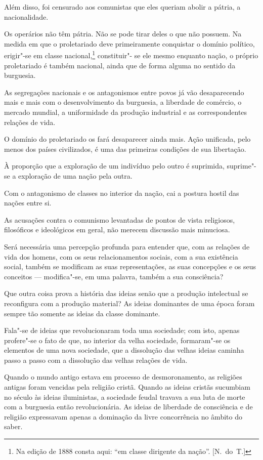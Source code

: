 Além disso, foi censurado aos comunistas que eles queriam abolir a
pátria, a nacionalidade.

Os operários não têm pátria. Não se pode tirar deles o que não
possuem. Na medida em que o proletariado deve primeiramente conquistar
o domínio político, erigir"-se em classe nacional,\footnote{ Na edição de 
1888 consta aqui: “em classe dirigente da nação”. [N.~do~T.]} constituir"-
se ele mesmo enquanto nação, o próprio
proletariado é também nacional, ainda que de forma alguma no sentido da
burguesia.

As segregações nacionais e os antagonismos entre povos já vão desaparecendo
mais e mais com o desenvolvimento da burguesia, a liberdade de
comércio, o mercado mundial, a uniformidade da produção industrial
e as correspondentes relações de vida.

O domínio do proletariado os fará desaparecer ainda mais. Ação
unificada, pelo menos dos países civilizados, é uma das primeiras
condições de sua libertação.

À proporção que a exploração de um indivíduo pelo outro é suprimida,
suprime"-se a exploração de uma nação pela outra.

Com o antagonismo de classes no interior da nação, cai a postura hostil
das nações entre si.

As acusações contra o comunismo levantadas de pontos de vista
religiosos, filosóficos e ideológicos em geral, não merecem discussão
mais minuciosa.

Será necessária uma percepção profunda para entender que, com as
relações de vida dos homens, com os seus relacionamentos sociais, com a
sua existência social, também se modificam as suas representações, as
suas concepções e os seus conceitos  ---  modifica"-se, em uma palavra,
também a sua consciência?

Que outra coisa prova a história das ideias senão que a produção
intelectual se reconfigura com a produção material? As ideias
dominantes de uma época foram sempre tão somente as ideias da classe
dominante.

Fala"-se de ideias que revolucionaram toda uma sociedade; com isto,
apenas profere"-se o fato de que, no interior da velha sociedade,
formaram"-se os elementos de uma nova sociedade, que a dissolução das
velhas ideias caminha passo a passo com a dissolução das velhas
relações de vida.

Quando o mundo antigo estava em processo de desmoronamento, as religiões
antigas foram vencidas pela religião cristã. Quando as ideias cristãs
sucumbiam no século  às ideias iluministas, a sociedade feudal
travava a sua luta de morte com a burguesia então revolucionária. As
ideias de liberdade de consciência e de religião expressavam apenas a
dominação da livre concorrência no âmbito do saber.

